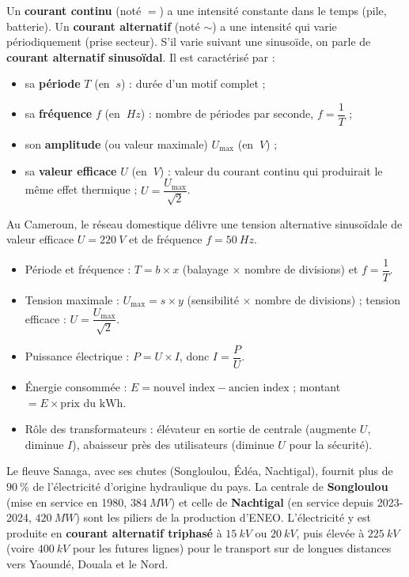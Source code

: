 \documentclass[11pt]{article}
\newcommand{\cle}[1]{{\popxbold\color{popdark}#1}}
\begin{document}
\begin{definition}
Un \textbf{courant continu} (noté $=$) a une intensité constante dans le temps (pile, batterie). Un \textbf{courant alternatif} (noté $\sim$) a une intensité qui varie périodiquement (prise secteur). S'il varie suivant une sinusoïde, on parle de \textbf{courant alternatif sinusoïdal}. Il est caractérisé par :
\begin{itemize}
\item sa \textbf{période} $T$ (en $\SI{}{s}$) : durée d'un motif complet ;
\item sa \textbf{fréquence} $f$ (en $\SI{}{Hz}$) : nombre de périodes par seconde, $f = \dfrac{1}{T}$ ;
\item son \textbf{amplitude} (ou valeur maximale) $U_{\max}$ (en $\SI{}{V}$) ;
\item sa \textbf{valeur efficace} $U$ (en $\SI{}{V}$) : valeur du courant continu qui produirait le même effet thermique ; $U = \dfrac{U_{\max}}{\sqrt{2}}$.
\end{itemize}
Au Cameroun, le réseau domestique délivre une tension alternative sinusoïdale de valeur efficace $U = \SI{220}{V}$ et de fréquence $f = \SI{50}{Hz}$.
\end{definition}

\begin{aretenir}
\begin{itemize}
\item Période et fréquence : $T = b \times x$ (balayage $\times$ nombre de divisions) et $f = \dfrac{1}{T}$.
\item Tension maximale : $U_{\max} = s \times y$ (sensibilité $\times$ nombre de divisions) ; tension efficace : $U = \dfrac{U_{\max}}{\sqrt{2}}$.
\item Puissance électrique : $P = U \times I$, donc $I = \dfrac{P}{U}$.
\item Énergie consommée : $E = \text{nouvel index} - \text{ancien index}$ ; montant $= E \times \text{prix du kWh}$.
\item Rôle des transformateurs : \cle{élévateur} en sortie de centrale (augmente $U$, diminue $I$), \cle{abaisseur} près des utilisateurs (diminue $U$ pour la sécurité).
\end{itemize}
\end{aretenir}

\begin{savaistu}
Le fleuve Sanaga, avec ses chutes (Songloulou, Édéa, Nachtigal), fournit plus de $\SI{90}{\%}$ de l'électricité d'origine hydraulique du pays. La centrale de \textbf{Songloulou} (mise en service en 1980, $\SI{384}{MW}$) et celle de \textbf{Nachtigal} (en service depuis 2023-2024, $\SI{420}{MW}$) sont les piliers de la production d'ENEO. L'électricité y est produite en \textbf{courant alternatif triphasé} à $\SI{15}{kV}$ ou $\SI{20}{kV}$, puis élevée à $\SI{225}{kV}$ (voire $\SI{400}{kV}$ pour les futures lignes) pour le transport sur de longues distances vers Yaoundé, Douala et le Nord.
\end{savaistu}
\end{document}
